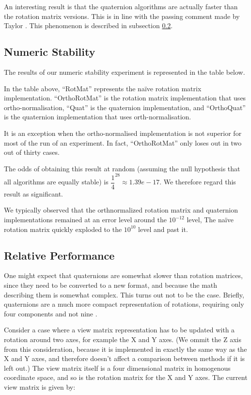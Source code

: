 \documentclass{acm_proc_article-sp}
\begin{document}
An interesting result is that the quaternion algorithms are actually faster than the rotation matrix versions.
This is in line with the passing comment made by Taylor \cite{taylor79}.
This phenomenon is described in subsection \ref{sec:performance}.

\subsection{Numeric Stability}
\label{sec:stability}

The results of our numeric stability experiment is represented in the table below.


In the table above, ``RotMat'' represents the na\"{i}ve rotation matrix implementation. ``OrthoRotMat'' is the rotation matrix implementation that uses ortho-normalisation, ``Quat'' is the quaternion implementation, and ``OrthoQuat'' is the quaternion implementation that uses orth-normalisation.

It is an exception when the ortho-normalised implementation is not superior for most of the run of an experiment.
In fact, ``OrthoRotMat'' only loses out in two out of thirty cases.

The odds of obtaining this result at random (assuming the null hypothesis that all algorithms are equally stable) is $\dfrac{1}{4}^{28} \approx 1.39e-17$.
We therefore regard this result as significant.

We typically observed that the orthnormalized rotation matrix and quaternion implementations remained at an error level around the $10^{-12}$ level, 
The na\"{i}ve rotation matrix quickly exploded to the $10^{10}$ level and past it.

\subsection{Relative Performance}
\label{sec:performance}

One might expect that quaternions are somewhat slower than rotation matrices, since they need to be converted to a new format, and because the math describing them is somewhat complex.
This turns out not to be the case.
Briefly, quaternions are a much more compact representation of rotations, requiring only four components and not nine \cite{taylor79}.

Consider a case where a view matrix representation has to be updated with a rotation around two axes, for example the X and Y axes.
(We ommit the Z axis from this consideration, because it is implemented in exactly the same way as the X and Y axes, and therefore doesn't affect a comparison between methods if it is left out.)
The view matrix itself is a four dimensional matrix in homogenous coordinate space, and so is the rotation matrix for the X and Y axes.
The current view matrix is given by:
\end{document}

